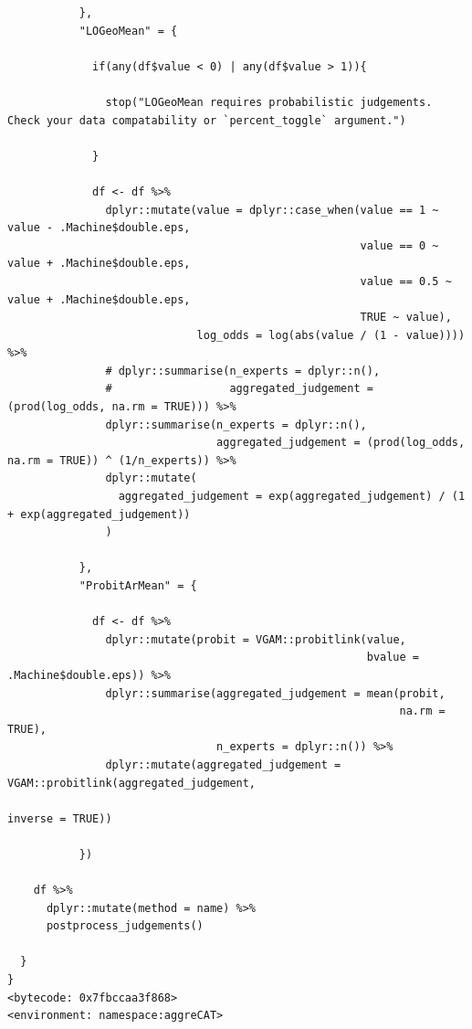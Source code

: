 \documentclass[article]{jss}
\begin{document}
\begin{tcolorbox}[enhanced jigsaw, arc=.35mm, toprule=.15mm, breakable, opacityback=0, colframe=quarto-callout-color-frame, rightrule=.15mm, colback=white, left=2mm, bottomrule=.15mm, leftrule=.75mm]
\begin{verbatim}
           },
           "LOGeoMean" = {

             if(any(df$value < 0) | any(df$value > 1)){

               stop("LOGeoMean requires probabilistic judgements. Check your data compatability or `percent_toggle` argument.")

             }

             df <- df %>%
               dplyr::mutate(value = dplyr::case_when(value == 1 ~ value - .Machine$double.eps,
                                                      value == 0 ~ value + .Machine$double.eps,
                                                      value == 0.5 ~ value + .Machine$double.eps,
                                                      TRUE ~ value),
                             log_odds = log(abs(value / (1 - value)))) %>%
               # dplyr::summarise(n_experts = dplyr::n(),
               #                  aggregated_judgement = (prod(log_odds, na.rm = TRUE))) %>%
               dplyr::summarise(n_experts = dplyr::n(),
                                aggregated_judgement = (prod(log_odds, na.rm = TRUE)) ^ (1/n_experts)) %>%
               dplyr::mutate(
                 aggregated_judgement = exp(aggregated_judgement) / (1 + exp(aggregated_judgement))
               )

           },
           "ProbitArMean" = {

             df <- df %>%
               dplyr::mutate(probit = VGAM::probitlink(value,
                                                       bvalue = .Machine$double.eps)) %>%
               dplyr::summarise(aggregated_judgement = mean(probit,
                                                            na.rm = TRUE),
                                n_experts = dplyr::n()) %>%
               dplyr::mutate(aggregated_judgement = VGAM::probitlink(aggregated_judgement,
                                                                     inverse = TRUE))

           })

    df %>%
      dplyr::mutate(method = name) %>%
      postprocess_judgements()

  }
}
<bytecode: 0x7fbccaa3f868>
<environment: namespace:aggreCAT>
\end{verbatim}


\end{tcolorbox}
\end{document}
